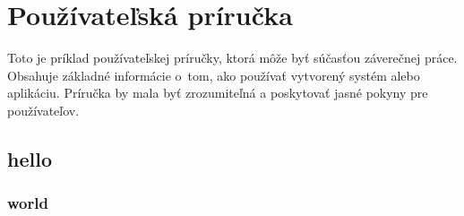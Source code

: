 
\chapter{Používateľská príručka}\label{app:user.manual}

Toto je príklad používateľskej príručky, ktorá môže byť súčasťou záverečnej práce. Obsahuje základné informácie o~tom, ako používať vytvorený systém alebo aplikáciu. Príručka by mala byť zrozumiteľná a poskytovať jasné pokyny pre používateľov.

\section{hello}

\subsection{world}
